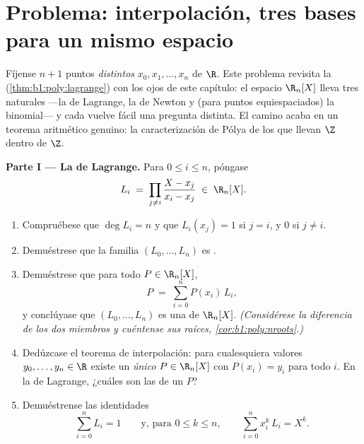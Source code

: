 \section{Problema: interpolación, tres bases para un mismo espacio}

\begin{problem}\label{pb:b1:vspaces:1}
Fíjense $n + 1$ puntos \emph{distintos} $x_0, x_1, \dots, x_n$ de
$\R$. Este problema revisita la 
(\cref{thm:b1:poly:lagrange}) con los ojos de este capítulo: el
espacio $\R_n[X]$ lleva tres  naturales ---la de Lagrange, la de
Newton y (para puntos equiespaciados) la  binomial--- y cada
 vuelve fácil una pregunta distinta. El camino acaba en un
teorema aritmético genuino: la caracterización de Pólya de los
 que llevan $\Z$ dentro de $\Z$.

\medskip
\noindent\textbf{Parte I --- La  de Lagrange.} Para
$0 \leq i \leq n$, póngase
\[
L_i \;=\; \prod_{j \neq i} \frac{X - x_j}{x_i - x_j} \;\in\;
\R_n[X].
\]
\begin{enumerate}
  \item Compruébese que $\deg L_i = n$ y que $L_i(x_j) = 1$ si
        $j = i$, y $0$ si $j \neq i$.
  \item Demuéstrese que la familia $(L_0, \dots, L_n)$ es .
  \item Demuéstrese que para todo $P \in \R_n[X]$,
        \[
        P \;=\; \sum_{i=0}^{n} P(x_i)\, L_i ,
        \]
        y conclúyase que $(L_0, \dots, L_n)$ es una  de
        $\R_n[X]$. \emph{(Considérese la diferencia de los dos
        miembros y cuéntense sus raíces, \cref{cor:b1:poly:nroots}.)}
  \item Dedúzcase el teorema de interpolación: para cualesquiera
        valores $y_0, \dots, y_n \in \R$ existe un \emph{único}
        $P \in \R_n[X]$ con $P(x_i) = y_i$ para todo $i$. En la
         de Lagrange, ¿cuáles son las  de un
         $P$?
  \item Demuéstrense las identidades
        \[
        \sum_{i=0}^{n} L_i = 1
        \qquad\text{y, para } 0 \leq k \leq n,\qquad
        \sum_{i=0}^{n} x_i^{k}\, L_i = X^{k} .
        \]
\end{enumerate}


\end{problem}
